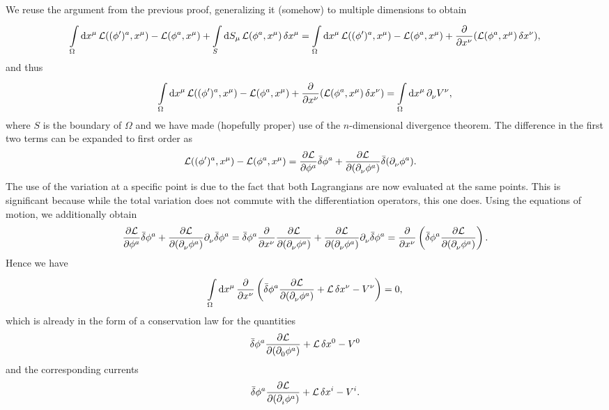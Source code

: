 We reuse the argument from the previous proof, generalizing it (somehow) to multiple dimensions to obtain
\begin{align*}
	\int\limits_{\Omega}^{}\dd{x^{\mu}}{\ensuremath{\mathcal{L}}((\phi^{\prime})^{a}, x^{\mu}) - \ensuremath{\mathcal{L}}(\phi^{a}, x^{\mu})} + \int\limits_{S}^{}\dd{S_{\mu}}{\ensuremath{\mathcal{L}}(\phi^{a}, x^{\mu})\var{x^{\mu}}} = \int\limits_{\Omega}^{}\dd{x^{\mu}}{\ensuremath{\mathcal{L}}((\phi^{\prime})^{a}, x^{\mu}) - \ensuremath{\mathcal{L}}(\phi^{a}, x^{\mu}) + \pdv{x^{\nu}}(\ensuremath{\mathcal{L}}(\phi^{a}, x^{\mu})\var{x^{\nu}})},
\end{align*}
and thus
\begin{align*}
	\int\limits_{\Omega}^{}\dd{x^{\mu}}{\ensuremath{\mathcal{L}}((\phi^{\prime})^{a}, x^{\mu}) - \ensuremath{\mathcal{L}}(\phi^{a}, x^{\mu}) + \pdv{x^{\nu}}(\ensuremath{\mathcal{L}}(\phi^{a}, x^{\mu})\var{x^{\nu}})} = \int\limits_{\Omega}^{}\dd{x^{\mu}}{\ensuremath{\partial^{}_{\nu}}{V^{\nu}}},
\end{align*}
where $S$ is the boundary of $\Omega$ and we have made (hopefully proper) use of the $n$-dimensional divergence theorem. The difference in the first two terms can be expanded to first order as
\begin{align*}
	\mathcal{L}((\phi^{\prime})^{a}, x^{\mu}) - \mathcal{L}(\phi^{a}, x^{\mu}) &= \pdv{\ensuremath{\mathcal{L}}}{\phi^{a}}\bar{\delta}\phi^{a} + \pdv{\ensuremath{\mathcal{L}}}{(\ensuremath{\partial^{}_{\nu}}{\phi^{a}})}\bar{\delta}(\partial^{}_{\nu}{\phi^{a}}).
\end{align*}
The use of the variation at a specific point is due to the fact that both Lagrangians are now evaluated at the same points. This is significant because while the total variation does not commute with the differentiation operators, this one does. Using the equations of motion, we additionally obtain
\begin{align*}
	\pdv{\ensuremath{\mathcal{L}}}{\phi^{a}}\bar{\delta}\phi^{a} + \pdv{\ensuremath{\mathcal{L}}}{(\ensuremath{\partial^{}_{\nu}}{\phi^{a}})}\partial^{}_{\nu}{\bar{\delta}\phi^{a}} = \bar{\delta}\phi^{a}\pdv{x^{\nu}}\pdv{\ensuremath{\mathcal{L}}}{(\ensuremath{\partial^{}_{\nu}}{\phi^{a}})} + \pdv{\ensuremath{\mathcal{L}}}{(\ensuremath{\partial^{}_{\nu}}{\phi^{a}})}\partial^{}_{\nu}{\bar{\delta}\phi^{a}} = \pdv{x^{\nu}}\left(\bar{\delta}\phi^{a}\pdv{\ensuremath{\mathcal{L}}}{(\ensuremath{\partial^{}_{\nu}}{\phi^{a}})}\right).
\end{align*}
Hence we have
\begin{align*}
	\int\limits_{\Omega}^{}\dd{x^{\mu}}{\pdv{x^{\nu}}\left(\bar{\delta}\phi^{a}\pdv{\ensuremath{\mathcal{L}}}{(\ensuremath{\partial^{}_{\nu}}{\phi^{a}})} + \ensuremath{\mathcal{L}}\var{x^{\nu}} - V^{\nu}\right)} = 0,
\end{align*}
which is already in the form of a conservation law for the quantities
\begin{align*}
	\bar{\delta}\phi^{a}\pdv{\ensuremath{\mathcal{L}}}{(\ensuremath{\partial^{}_{0}}{\phi^{a}})} + \mathcal{L}\var{x^{0}} - V^{0}
\end{align*}
and the corresponding currents
\begin{align*}
	\bar{\delta}\phi^{a}\pdv{\ensuremath{\mathcal{L}}}{(\ensuremath{\partial^{}_{i}}{\phi^{a}})} + \mathcal{L}\var{x^{i}} - V^{i}.
\end{align*}

